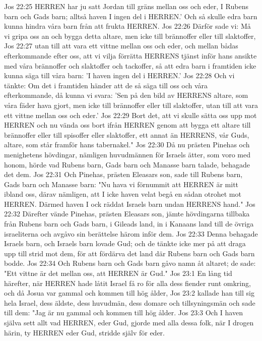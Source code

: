 Jos 22:25  HERREN har ju satt Jordan till gräns mellan oss och eder, I Rubens barn och Gads barn; alltså haven I ingen del i HERREN.' Och så skulle edra barn kunna hindra våra barn från att frukta HERREN.
Jos 22:26  Därför sade vi: Må vi gripa oss an och bygga detta altare, men icke till brännoffer eller till slaktoffer,
Jos 22:27  utan till att vara ett vittne mellan oss och eder, och mellan bådas efterkommande efter oss, att vi vilja förrätta HERRENS tjänst inför hans ansikte med våra brännoffer och slaktoffer och tackoffer, så att edra barn i framtiden icke kunna säga till våra barn: 'I haven ingen del i HERREN.'
Jos 22:28  Och vi tänkte: Om det i framtiden händer att de så säga till oss och våra efterkommande, då kunna vi svara: 'Sen på den bild av HERRENS altare, som våra fäder hava gjort, men icke till brännoffer eller till slaktoffer, utan till att vara ett vittne mellan oss och eder.'
Jos 22:29  Bort det, att vi skulle sätta oss upp mot HERREN och nu vända oss bort ifrån HERREN genom att bygga ett altare till brännoffer eller till spisoffer eller slaktoffer, ett annat än HERRENS, vår Guds, altare, som står framför hans tabernakel."
Jos 22:30  Då nu prästen Pinehas och menighetens hövdingar, nämligen huvudmännen för Israels ätter, som voro med honom, hörde vad Rubens barn, Gads barn och Manasse barn talade, behagade det dem.
Jos 22:31  Och Pinehas, prästen Eleasars son, sade till Rubens barn, Gads barn och Manasse barn: "Nu hava vi förnummit att HERREN är mitt ibland oss, därav nämligen, att I icke haven velat begå en sådan otrohet mot HERREN. Därmed haven I ock räddat Israels barn undan HERRENS hand."
Jos 22:32  Därefter vände Pinehas, prästen Eleasars son, jämte hövdingarna tillbaka från Rubens barn och Gads barn, i Gileads land, in i Kanaans land till de övriga israeliterna och avgåvo sin berättelse härom inför dem.
Jos 22:33  Denna behagade Israels barn, och Israels barn lovade Gud; och de tänkte icke mer på att draga upp till strid mot dem, för att fördärva det land där Rubens barn och Gads barn bodde.
Jos 22:34  Och Rubens barn och Gads barn gåvo namn åt altaret; de sade: "Ett vittne är det mellan oss, att HERREN är Gud."
Jos 23:1  En lång tid härefter, när HERREN hade låtit Israel få ro för alla dess fiender runt omkring, och då Josua var gammal och kommen till hög ålder,
Jos 23:2  kallade han till sig hela Israel, dess äldste, dess huvudmän, dess domare och tillsyningsmän och sade till dem: "Jag är nu gammal och kommen till hög ålder.
Jos 23:3  Och I haven själva sett allt vad HERREN, eder Gud, gjorde med alla dessa folk, när I drogen härin, ty HERREN eder Gud, stridde själv för eder.

